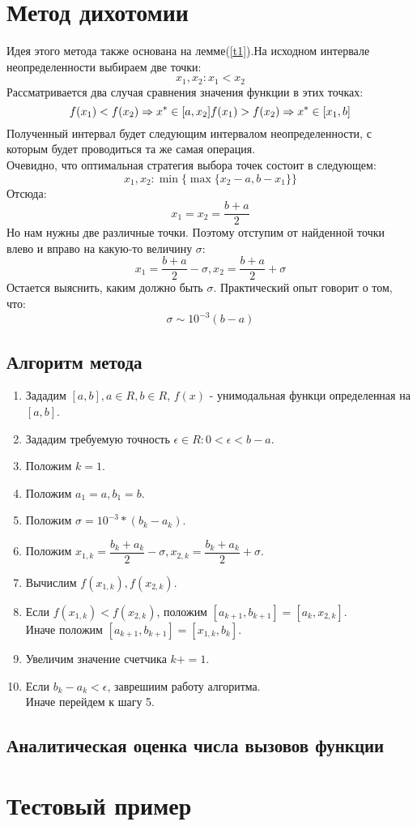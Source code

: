 \documentclass[12pt]{article}
\begin{document}
\section{Метод дихотомии }
Идея этого метода также основана на лемме(\ref{t1}).На
исходном интервале неопределенности выбираем две точки:\\
$$
    x_1, x_2: x_1<x_2
$$
Рассматривается два случая сравнения значения функции в этих точках:\\
$$
    f(x_1)<f(x_2)\Rightarrow x^{*}\in [a,x_2]\\
    f(x_1)>f(x_2)\Rightarrow x^{*}\in [x_1, b]\\
$$
Полученный интервал будет следующим интервалом неопределенности, с которым
будет проводиться та же самая операция.\\
Очевидно, что оптимальная стратегия выбора точек состоит в следующем:
$$
    x_1,x_2: \min \{\max \{x_2-a, b-x_1\}\}
$$
Отсюда:
$$
    x_1=x_2=\dfrac{b+a}{2}
$$
Но нам нужны две различные точки. Поэтому отступим от найденной точки влево и вправо на какую-то величину $\sigma$:
$$
    x_1=\dfrac{b+a}{2}-\sigma, x_2=\dfrac{b+a}{2}+\sigma
$$
Остается выяснить, каким должно быть $\sigma$. Практический опыт говорит о том, что:
$$
    \sigma	\sim 10^{-3}(b-a)
$$
\subsection{Алгоритм метода}
\begin{enumerate}
    \item Зададим $[a,b], a\in R, b\in R $, $f(x)$ - унимодальная функци определенная на $[a,b]$.
    \item Зададим требуемую точность $\epsilon \in R : 0< \epsilon < b-a$.
    \item Положим $k=1$.
    \item Положим $a_1=a, b_1=b$.
    \item Положим $\sigma = 10^{-3}*(b_k-a_k)$.
    \item Положим $x_{1,k} = \dfrac{b_k+a_k}{2}-\sigma, x_{2,k} = \dfrac{b_k+a_k}{2}+\sigma$.
    \item Вычислим $f(x_{1,k}), f(x_{2,k})$.
    \item Если $f(x_{1,k})<f(x_{2,k})$, положим $[a_{k+1}, b_{k+1}]=[a_k, x_{2,k}]$.\\
    Иначе положим $[a_{k+1}, b_{k+1}]=[x_{1,k}, b_k]$.
    \item Увеличим значение счетчика $k+=1$. \\
    \item Если $b_k-a_k<\epsilon$, заврешиим работу алгоритма.\\
    Иначе перейдем к шагу 5.
    
\end{enumerate}
\subsection{Аналитическая оценка числа вызовов функции}
\section{Тестовый пример}
\end{document}
